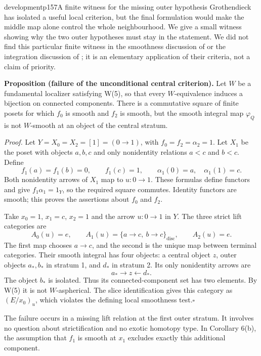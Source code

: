 \begin{dcomment}{development}{p157}{A finite witness for the missing outer hypothesis}
Grothendieck has isolated a useful local criterion, but the final formulation would make the middle map alone control the whole neighbourhood. We give a small witness showing why the two outer hypotheses must stay in the statement. We did not find this particular finite witness in the smoothness discussion of \citet{Maltsiniotis2005Asphericite} or the integration discussion of \citet[\S3.3]{Cisinski2006}; it is an elementary application of their criteria, not a claim of priority.

\textbf{Proposition (failure of the unconditional central criterion).}\ours
Let $W$ be a fundamental localizer satisfying W(5), so that every $W$-equivalence induces a bijection on connected components. There is a commutative square of finite posets for which $f_0$ is smooth and $f_2$ is smooth, but the smooth integral map $\varphi_Q$ is not $W$-smooth at an object of the central stratum.

\textit{Proof.} Let $Y=X_0=X_2=[1]=(0\to1)$, with $f_0=f_2=\alpha_2=1$. Let $X_1$ be the poset with objects $a,b,c$ and only nonidentity relations $a<c$ and $b<c$. Define
\[
 f_1(a)=f_1(b)=0,\qquad f_1(c)=1,
 \qquad \alpha_1(0)=a,\quad\alpha_1(1)=c.
\]
Both nonidentity arrows of $X_1$ map to $u:0\to1$. These formulas define functors and give $f_1\alpha_1=1_Y$, so the required square commutes. Identity functors are smooth; this proves the assertions about $f_0$ and $f_2$.

Take $x_0=1$, $x_1=c$, $x_2=1$ and the arrow $u:0\to1$ in $Y$. The three strict lift categories are
\[
 A_0(u)=e,\qquad A_1(u)=\{a\to c,\ b\to c\}_{\mathrm{disc}},
 \qquad A_2(u)=e.
\]
The first map chooses $a\to c$, and the second is the unique map between terminal categories. Their smooth integral has four objects: a central object $z$, outer objects $a_*,b_*$ in stratum 1, and $d_*$ in stratum 2. Its only nonidentity arrows are
\[
                 a_*\longrightarrow z\longleftarrow d_*.
\]
The object $b_*$ is isolated. Thus its connected-component set has two elements. By W(5) it is not $W$-aspherical. The slice identification gives this category as $(E/x_0)_u$, which violates the defining local smoothness test.\hfill$\square$

The failure occurs in a missing lift relation at the first outer stratum. It involves no question about strictification and no exotic homotopy type. In Corollary 6(b), the assumption that $f_1$ is smooth at $x_1$ excludes exactly this additional component.
\end{dcomment}

